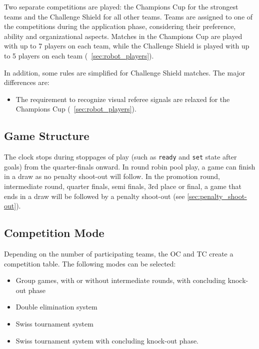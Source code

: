 Two separate competitions are played: the Champions Cup for the strongest teams and the Challenge Shield for all other teams.
Teams are assigned to one of the competitions during the application phase, considering their preference, ability and organizational aspects.
Matches in the Champions Cup are played with up to 7 players on each team, while the Challenge Shield is played with up to 5 players on each team (\cf~\cref{sec:robot_players}).

In addition, some rules are simplified for Challenge Shield matches. The major differences are:
\begin{itemize}
  \item The requirement to recognize visual referee signals are relaxed for the Champions Cup (\cf~\cref{sec:robot_players}).

\end{itemize}

\subsection{Game Structure}

The clock stops during stoppages of play (such as \texttt{ready} and \texttt{set} state after goals) from the quarter-finals onward.
In round robin pool play, a game can finish in a draw as no penalty shoot-out will follow.
In the promotion round, intermediate round, quarter finals, semi finals, 3rd place or final, a game that ends in a draw will be followed by a penalty shoot-out (see \cref{sec:penalty_shoot-out}).

\subsection{Competition Mode}

Depending on the number of participating teams, the OC and TC create a competition table.
The following modes can be selected:
\begin{itemize}
  \item Group games, with or without intermediate rounds, with concluding knock-out phase
  \item Double elimination system
  \item Swiss tournament system
  \item Swiss tournament system with concluding knock-out phase.
\end{itemize}


